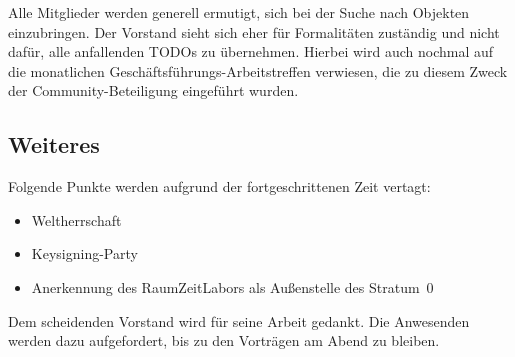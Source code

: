 \documentclass{s0minutes}
\begin{document}
Alle Mitglieder werden generell ermutigt, sich bei der Suche nach Objekten
einzubringen. Der Vorstand sieht sich eher für Formalitäten zuständig und nicht
dafür, alle anfallenden TODOs zu übernehmen. Hierbei wird auch nochmal auf die
monatlichen Geschäftsführungs-Arbeitstreffen verwiesen, die zu diesem Zweck der
Community-Beteiligung eingeführt wurden.

\subsection{Weiteres}

Folgende Punkte werden aufgrund der fortgeschrittenen Zeit vertagt:
\begin{itemize}
  \item Weltherrschaft
  \item Keysigning-Party
  \item Anerkennung des RaumZeitLabors als Außenstelle des Stratum~0
\end{itemize}

Dem scheidenden Vorstand wird für seine Arbeit gedankt. Die Anwesenden werden
dazu aufgefordert, bis zu den Vorträgen am Abend zu bleiben.
\end{document}
